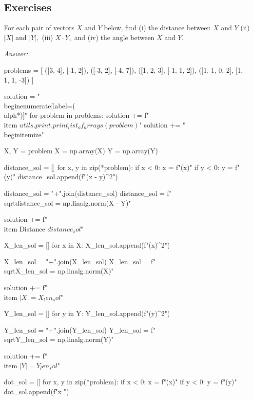 \documentclass[letterpaper]{article}
\newcommand{\ans}{\textit{Answer: }}
\newenvironment{question}[2][Question]{\begin{trivlist}
\item[\hskip \labelsep {\bfseries #1}\hskip \labelsep {\bfseries #2.}]}{\end{trivlist}}
\begin{document}
\subsection{Exercises}

\begin{question}{6.1}
  For each pair of vectors $X$ and $Y$ below, find (i) the distance between $X$ and $Y$
  (ii) $|X|$ and $|Y|,$ (iii) $X \cdot Y,$ and (iv) the angle between $X$ and $Y .$
  
  \ans 

  \begin{pycode}
problems = [
  ([3, 4], [-1, 2]),
  ([-3, 2], [-4, 7]),
  ([1, 2, 3], [-1, 1, 2]),
  ([1, 1, 0, 2], [1, 1, 1, -3])
]

solution = "\\begin{enumerate}[label=(\\alph*)]\n"
for problem in problems:
  solution += f"\\item ${utils.print.print_list_of_arrays(problem)}$\n"
  solution += "\\begin{itemize}\n"
  
  X, Y = problem
  X = np.array(X)
  Y = np.array(Y)

  distance_sol = []
  for x, y in zip(*problem):
    if x < 0:
      x = f"({x})"
    if y < 0:
      y = f"({y})"
    distance_sol.append(f"({x} - {y})^2")

  distance_sol = "+".join(distance_sol)
  distance_sol = f"\\sqrt{{{distance_sol}}} = {np.linalg.norm(X - Y)}"

  solution += f"\\item Distance ${distance_sol}$\n"

  X_len_sol = []
  for x in X:
    X_len_sol.append(f"({x})^2")

  X_len_sol = "+".join(X_len_sol)
  X_len_sol = f"\\sqrt{{{X_len_sol}}} = {np.linalg.norm(X)}"

  solution += f"\\item $|X| = {X_len_sol}$\n"

  Y_len_sol = []
  for y in Y:
    Y_len_sol.append(f"({y})^2")

  Y_len_sol = "+".join(Y_len_sol)
  Y_len_sol = f"\\sqrt{{{Y_len_sol}}} = {np.linalg.norm(Y)}"

  solution += f"\\item $|Y| = {Y_len_sol}$\n"

  dot_sol = []
  for x, y in zip(*problem):
    if x < 0:
      x = f"({x})"
    if y < 0:
      y = f"({y})"
    dot_sol.append(f"{x} ")


\end{pycode}
\end{question}
\end{document}
